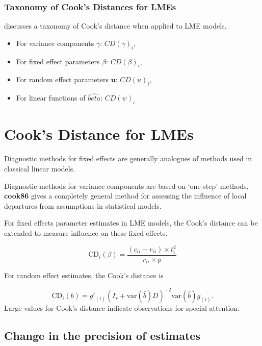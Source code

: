 \documentclass[12pt, a4paper]{article}
\begin{document}
	\subsubsection{Taxonomy of Cook's Distances for LMEs}
	\citet{Zewotir} discusses a taxonomy of Cook's distance when applied to LME models. 
	\begin{itemize}
		\item For variance components $\gamma$: $CD(\gamma)_i$,
		\item For fixed effect parameters $\beta$: $CD(\beta)_i$,
		\item For random effect parameters $\boldsymbol{u}$: $CD(u)_i$,
		\item For linear functions of $\hat{beta}$: $CD(\psi)_i$
	\end{itemize}			
	
	
	
	
\section{Cook's Distance for LMEs} %
Diagnostic methods for fixed effects are generally analogues of methods used in classical linear models.

Diagnostic methods for variance components are based on `one-step' methods. \textbf{cook86} gives a completely general method for assessing the influence of local departures from assumptions in statistical models.

For fixed effects parameter estimates in LME models, the  Cook's distance can be extended to measure influence on these fixed effects.

\[
\mbox{CD}_{i}(\beta) = \frac{(c_{ii} - r_{ii}) \times t^2_{i}}{r_{ii} \times p}
\]

For random effect estimates, the  Cook's distance is

\[
\mbox{CD}_{i}(b) = g{\prime}_{(i)} (I_{r} + \mbox{var}(\hat{b})D)^{-2}\mbox{var}(\hat{b})g_{(i)}.
\]
Large values for Cook's distance indicate observations for special attention.

\subsection{Change in the precision of estimates}
\end{document}
